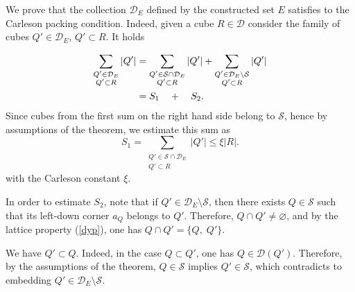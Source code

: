 \documentclass[12pt]{amsart} \setlength{\textwidth}{15cm} \setlength{\textheight}{24cm} \setlength{\voffset}{-1cm} \setlength{\oddsidemargin}{-0.4cm} \setlength{\evensidemargin}{-0.4cm}
\theoremstyle{definition}
\theoremstyle{remark}
\begin{document}
We prove that the  collection $\mathcal{D}_E$ defined by the constructed set $E$ satisfies to the Carleson packing condition.
Indeed, given a cube $R \in \mathcal{D}$ consider the family of cubes $Q' \in \mathcal{D}_E$, $Q' \subset R$. It holds

\[
\aligned
\sum_{\substack {Q' \in \mathcal{D}_E\\ Q' \subset R}}|Q'|
&= \sum_{\substack {Q' \in \mathcal{S}\cap \mathcal{D}_E\\ Q' \subset R}} |Q'| + \sum_{\substack {Q' \in  \mathcal{D}_E \setminus \mathcal{S}\\ Q' \subset R}} |Q'|\\
&=S_1\quad +\quad S_2.
\endaligned
\]
Since cubes from the first sum on the right hand side belong to $ \mathcal{S}$,  hence by assumptions of the theorem, we estimate this sum as
\[
S_1= \sum_{\substack {Q' \in \mathcal{S}\cap \mathcal{D}_E\\ Q' \subset R}} |Q'|\leq \xi |R|.
\]
with the Carleson constant $\xi$.

In order to estimate $S_2$, note that if $Q' \in \mathcal{D}_E \setminus \mathcal{S}$, then there exists
$Q \in \mathcal{S}$ such that its left-down corner  $a_Q $ belongs to $Q'$. Therefore,  $Q\cap Q' \neq \varnothing$,
and by the lattice property (\ref{dyp}), one has $Q\cap Q'= \{Q,\;Q'\}$.

We have $Q'\subset Q$. Indeed, in the case  $Q \subset  Q'$, one has  $Q \in \mathcal{D}(Q')$. Therefore,  by the assumptions of the theorem,  $Q \in \mathcal{S}$ implies  $Q' \in \mathcal{S}$, which contradicts to embedding $Q' \in \mathcal{D}_E \setminus \mathcal{S}$.
\end{document}
